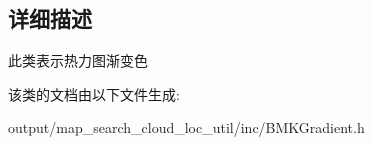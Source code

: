 \subsection{详细描述}
此类表示热力图渐变色 

该类的文档由以下文件生成\+:\begin{DoxyCompactItemize}
\item 
output/map\+\_\+search\+\_\+cloud\+\_\+loc\+\_\+util/inc/B\+M\+K\+Gradient.\+h\end{DoxyCompactItemize}
